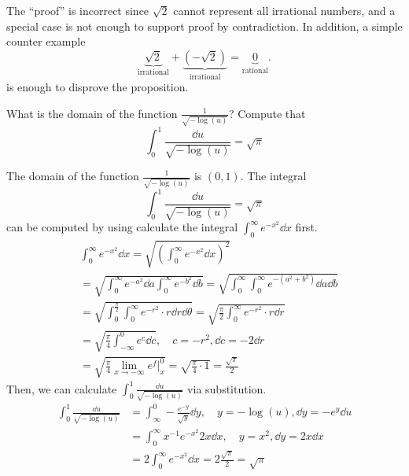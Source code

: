 \documentclass[8pt,twocolumn]{article}
\begin{document}
\begin{Answer}[number=15]
  The ``proof'' is incorrect since $\sqrt{2}$ cannot represent all irrational
  numbers, and a special case is not enough to support proof by contradiction.
  In addition, a simple counter example
  \[\underbrace{\sqrt{2}}_\text{irrational} +
  \underbrace{(-\sqrt{2})}_\text{irrational} = \underbrace{0}_\text{rational}.\]
  is enough to disprove the proposition.
\end{Answer}

\begin{Exercise}[number=16]
  What is the domain of the function $\frac{1}{\sqrt{-\log(u)}}$? Compute that
  \[
    \int_0^1 \frac{\dd{u}}{\sqrt{-\log(u)}} = \sqrt{\pi}
  \]
\end{Exercise}

\begin{Answer}[number=16]
  The domain of the function $\frac{1}{\sqrt{-\log(u)}}$ is $(0,1)$. The
  integral
  \[
    \int_0^1 \frac{\dd{u}}{\sqrt{-\log(u)}} = \sqrt{\pi}
  \]
  can be computed by using calculate the integral $\int_0^\infty
  e^{-x^2}\dd{x}$ first.
  \begin{align*}
    &\int_0^\infty e^{-x^2}\dd{x} = \sqrt{(\int_0^\infty e^{-x^2}\dd{x})^2} \\
    &= \sqrt{\int_0^\infty e^{-a^2}\dd{a}\int_0^\infty e^{-b^2}\dd{b}}
    = \sqrt{\int_0^\infty\int_0^\infty e^{-(a^2+b^2)}\dd{a}\dd{b}} \\
    &= \sqrt{\int_0^\frac{\pi}{2}\int_0^\infty e^{-r^2} \cdot r
    \dd{r}\dd{\theta}}
    = \sqrt{\frac{\pi}{2}\int_0^\infty e^{-r^2} \cdot r \dd{r}} \\
    &= \sqrt{\frac{\pi}{4}\int_{-\infty}^{0} e^c \dd{c}},\quad c =
    -r^2, \dd{c} = -2\dd{r}  \\
    &= \sqrt{\frac{\pi}{4}\lim_{x\to-\infty}e^f\vert^0_x} =
    \sqrt{\frac{\pi}{4}\cdot 1} = \frac{\sqrt{\pi}}{2}
  \end{align*}
  Then, we can calculate $\int_0^1 \frac{\dd{u}}{\sqrt{-\log(u)}}$ via
  substitution.
  \begin{align*}
    \int_0^1 \frac{\dd{u}}{\sqrt{-\log(u)}} &= \int_\infty^0
    -\frac{e^{-y}}{\sqrt{y}} \dd{y},\quad y=-\log(u), \dd{y} = -e^y\dd{u} \\
    &= \int_0^\infty x^{-1} e^{-x^2} 2x \dd{x},\quad y=x^2,
    \dd{y}=2x\dd{x} \\
    &= 2\int_0^\infty e^{-x^2} \dd{x} = 2\frac{\sqrt{\pi}}{2} = \sqrt{\pi}
  \end{align*}
\end{Answer}
\end{document}
